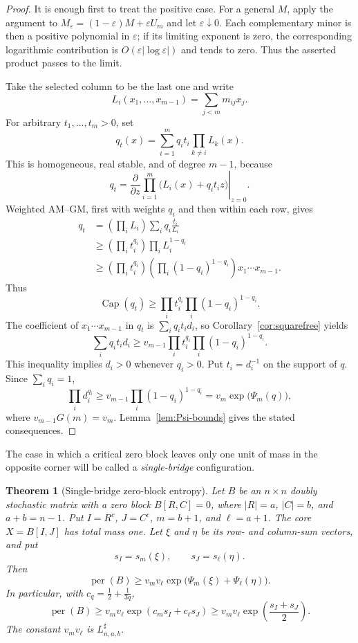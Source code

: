 \documentclass[11pt]{article}
\newtheorem{theorem}{Theorem}[section]
\theoremstyle{definition}
\newcommand{\per}{\operatorname{per}}
\newcommand{\pcap}{\operatorname{Cap}}
\newcommand{\1}{\mathbf{1}}
\newcommand{\eps}{\varepsilon}
\begin{document}
\begin{proof}
It is enough first to treat the positive case.  For a general $M$, apply
the argument to $M_\eps=(1-\eps)M+\eps U_m$ and let $\eps\downarrow0$.
Each complementary minor is then a positive polynomial in $\eps$; if its
limiting exponent is zero, the corresponding logarithmic contribution is
$O(\eps|\log\eps|)$ and tends to zero.  Thus the asserted product passes
to the limit.

Take the selected column to be the last one and write
\[
 L_i(x_1,\dots,x_{m-1})=\sum_{j<m}m_{ij}x_j.
\]
For arbitrary $t_1,\dots,t_m>0$, set
\[
 q_t(x)=\sum_{i=1}^m q_i t_i\prod_{k\ne i}L_k(x).
\]
This is homogeneous, real stable, and of degree $m-1$, because
\[
 q_t=
 \left.\frac{\partial}{\partial z}
 \prod_{i=1}^m\bigl(L_i(x)+q_it_i z\bigr)\right|_{z=0}.
\]
Weighted AM--GM, first with weights $q_i$ and then within each row, gives
\[
 \begin{aligned}
 q_t
 &=\left(\prod_iL_i\right)\sum_iq_i\frac{t_i}{L_i}\\
 &\ge\left(\prod_i t_i^{q_i}\right)
      \prod_iL_i^{1-q_i}\\
 &\ge\left(\prod_i t_i^{q_i}\right)
      \left(\prod_i(1-q_i)^{1-q_i}\right)
      x_1\cdots x_{m-1}.
 \end{aligned}
\]
Thus
\[
 \pcap(q_t)\ge
 \prod_i t_i^{q_i}\prod_i(1-q_i)^{1-q_i}.
\]
The coefficient of $x_1\cdots x_{m-1}$ in $q_t$ is
$\sum_iq_it_id_i$, so Corollary~\ref{cor:squarefree} yields
\[
 \sum_iq_it_id_i\ge
 v_{m-1}\prod_i t_i^{q_i}\prod_i(1-q_i)^{1-q_i}.
\]
This inequality implies $d_i>0$ whenever $q_i>0$.  Put $t_i=d_i^{-1}$
on the support of $q$.  Since $\sum_iq_i=1$,
\[
 \prod_i d_i^{q_i}
 \ge v_{m-1}\prod_i(1-q_i)^{1-q_i}
 =v_m\exp\bigl(\Psi_m(q)\bigr),
\]
where $v_{m-1}G(m)=v_m$.  Lemma~\ref{lem:Psi-bounds} gives the stated
consequences.
\end{proof}

The case in which a critical zero block leaves only one unit of mass in the
opposite corner will be called a \emph{single-bridge} configuration.

\begin{theorem}[Single-bridge zero-block entropy]\label{thm:single-bridge-entropy}
Let $B$ be an $n\times n$ doubly stochastic matrix with a zero block
$B[R,C]=0$, where $|R|=a$, $|C|=b$, and $a+b=n-1$.
Put $I=R^c$, $J=C^c$, $m=b+1$, and $\ell=a+1$.
The core $X=B[I,J]$ has total mass one.  Let $\xi$ and $\eta$ be its row-
and column-sum vectors, and put
\[
 s_I=s_m(\xi),\qquad s_J=s_\ell(\eta).
\]
Then
\begin{equation}\label{eq:single-bridge-entropy-exact}
 \per(B)\ge
 v_mv_\ell\exp\bigl(\Psi_m(\xi)+\Psi_\ell(\eta)\bigr).
\end{equation}
In particular, with $c_q=\frac12+\frac1{3q}$,
\begin{equation}\label{eq:single-bridge-entropy-strong}
 \per(B)\ge v_mv_\ell\exp(c_ms_I+c_\ell s_J)
 \ge v_mv_\ell\exp\left(\frac{s_I+s_J}{2}\right).
\end{equation}
The constant $v_mv_\ell$ is $L^{\sharp}_{n,a,b}$.
\end{theorem}
\end{document}
